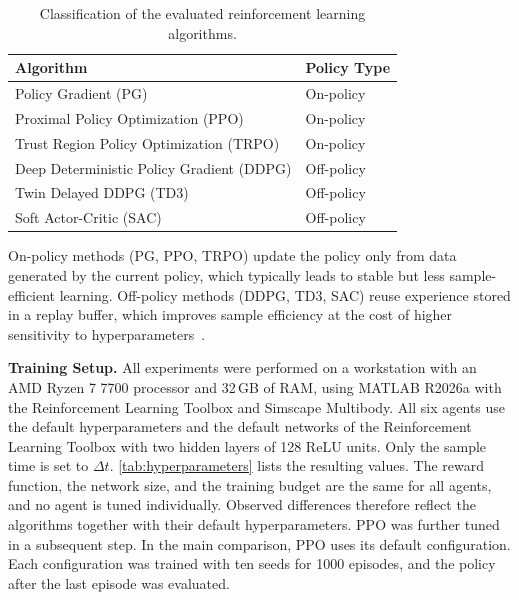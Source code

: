 \documentclass{ieeeaccess}
\begin{document}
\begin{table}[!t]
\centering
\caption{Classification of the evaluated reinforcement learning algorithms.}
\label{tab:on_off_policy}
\begin{tabular}{ll}
\toprule
\textbf{Algorithm} & \textbf{Policy Type} \\
\midrule
Policy Gradient (PG) & On-policy \\
Proximal Policy Optimization (PPO) & On-policy  \\
Trust Region Policy Optimization (TRPO) & On-policy  \\
Deep Deterministic Policy Gradient (DDPG) & Off-policy  \\
Twin Delayed DDPG (TD3) & Off-policy  \\
Soft Actor-Critic (SAC) & Off-policy  \\
\bottomrule
\end{tabular}
\end{table}
On-policy methods (PG, PPO, TRPO) update the policy only from data generated by the
current policy, which typically leads to stable but less sample-efficient learning. Off-policy methods (DDPG,
TD3, SAC) reuse experience stored in a replay buffer, which improves sample efficiency at
the cost of higher sensitivity to hyperparameters~\cite{b2,b7}.

\textbf{Training Setup.} All experiments were performed on a workstation with an AMD Ryzen 7 7700
processor and 32\,GB of RAM, using MATLAB R2026a with the Reinforcement Learning Toolbox and Simscape
Multibody. All six agents use the default hyperparameters and the default networks of the Reinforcement
Learning Toolbox with two hidden layers of 128 ReLU units. Only the sample time is set to
$\Delta t$. \cref{tab:hyperparameters} lists the resulting values. The reward function, the network size,
and the training budget are the same for all agents, and no agent is tuned individually. Observed
differences therefore reflect the algorithms together with their default hyperparameters. PPO was further
tuned in a subsequent step. In the main comparison, PPO uses its default configuration. Each
configuration was trained with ten seeds for 1000 episodes, and the policy after the last episode was
evaluated.
\end{document}
